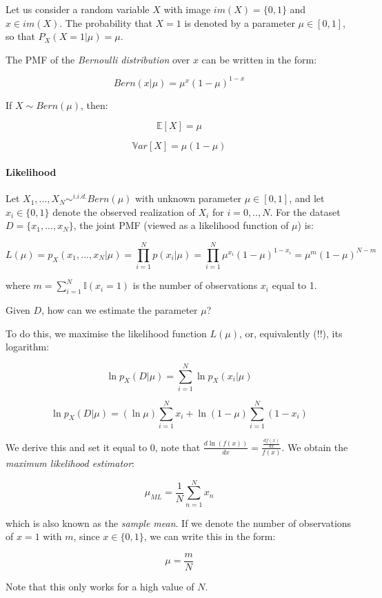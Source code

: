 \documentclass{article}
\begin{document}
Let us consider a random variable \(X\) with image \(im(X) = \{0, 1\}\)
and \(x \in
im(X)\). The probability that \(X=1\) is denoted by a parameter
\(\mu \in [0,1]\), so that \(P_X(X=1|\mu ) = \mu\).

The PMF of the \emph{Bernoulli distribution} over \(x\) can be written
in the form:

\[Bern(x | \mu ) = \mu^x (1 - \mu)^{1-x}\]

If \(X \sim Bern(\mu)\), then:

\[\mathbb{E}[X] = \mu\]

\[\mathbb{V}ar[X] = \mu (1-\mu)\]

\paragraph{Likelihood}\label{likelihood}

Let \(X_1, ..., X_N \sim^{i.i.d.} Bern(\mu)\) with unknown parameter
\(\mu \in [0,
1]\), and let \(x_i \in \{0, 1\}\) denote the observed realization of
\(X_i\) for \(i
= 0, .., N\). For the dataset \(D=\{x_1, ..., x_N\}\), the joint PMF
(viewed as a likelihood function of \(\mu\)) is:

\[L(\mu) = p_X(x_1,...,x_N|\mu ) = \prod_{i=1}^N p(x_i | \mu) = \prod_{i=1}^N \mu^{x_i}(1-\mu)^{1-x_i} = \mu^{m} (1-\mu)^{N-m}\]

where \(m = \sum_{i=1}^N \mathbb{I}(x_i = 1)\) is the number of
observations \(x_i\) equal to 1.

Given \(D\), how can we estimate the parameter \(\mu\)?

To do this, we maximise the likelihood function \(L(\mu)\), or,
equivalently (!!), its logarithm:

\[\ln p_X(D|\mu) = \sum_{i=1}^N \ln p_X(x_i|\mu )\]

\[\ln p_X(D|\mu) = (\ln \mu) \sum_{i=1}^N x_i + \ln (1-\mu )\sum_{i=1}^N (1-x_i)\]

We derive this and set it equal to 0, note that
\(\frac{d \ln(f(x))}{dx} =
\frac{\frac{d f(x)}{dx}}{f(x)}\). We obtain the \emph{maximum likelihood
estimator}:

\[\mu_{ML}=\frac{1}{N}\sum_{n=1}^N x_n\]

which is also known as the \emph{sample mean}. If we denote the number
of observations of \(x=1\) with \(m\), since \(x \in \{0, 1\}\), we can
write this in the form:

\[\mu = \frac{m}{N}\]

Note that this only works for a high value of \(N\).
\end{document}
